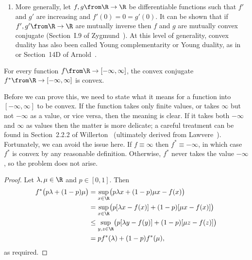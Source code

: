 \begin{examples}
\begin{enumerate}
\item
More generally, let $f, g \from \R \to \R$ be differentiable functions such
that $f'$ and $g'$ are increasing and $f'(0) = 0 = g'(0)$.  It can be shown
that if $f', g' \from \R \to \R$ are mutually inverse then $f$ and $g$ are
mutually convex conjugate (Section~I.9 of Zygmund~\cite{Zygm}).  At this
level of generality, convex duality has also been called Young
complementarity or Young%
% 
% 
duality, as in~\cite{Zygm} or Section~14D of Arnold~\cite{Arno}.
\end{enumerate}
\end{examples}


\begin{lemma}
For every function $f \from \R \to [-\infty, \infty]$, the convex conjugate
$f^* \from \R \to [-\infty, \infty]$ is convex.
\end{lemma}

Before we can prove this, we need to state what it means for a function
into $[-\infty, \infty]$ to be convex.  If the function takes only finite
values, or takes $\infty$ but not $-\infty$ as a value, or vice versa, then
the meaning is clear.  If it takes both $-\infty$ and $\infty$ as values
then the matter is more delicate; a careful treatment can be found in
Section~2.2.2 of Willerton~\cite{WillLFT} (ultimately derived from
Lawvere~\cite{LawvSCC}).  Fortunately, we can avoid the issue here.  If $f
\equiv \infty$ then $f^* \equiv -\infty$, in which case $f^*$ is convex by
any reasonable definition.  Otherwise, $f^*$ never takes the value
$-\infty$, so the problem does not arise.

\begin{proof}
Let $\lambda, \mu \in \R$ and $p \in [0, 1]$.  Then
% 
\begin{align*}
f^*\bigl(p\lambda + (1 - p)\mu\bigr)    &
=
\sup_{x \in \R} \bigl(
p\lambda x + (1 - p)\mu x - f(x)
\bigr)  \\
&
=
\sup_{x \in \R} \bigl(
p [\lambda x - f(x)] + (1 - p)[\mu x - f(x)]
\bigr)  \\
&
\leq
\sup_{y, z \in \R} \bigl(
p [\lambda y - f(y)] + (1 - p)[\mu z - f(z)]
\bigr)  \\
&
=
p f^*(\lambda) + (1 - p)f^*(\mu),
\end{align*}
% 
as required.
\end{proof}

